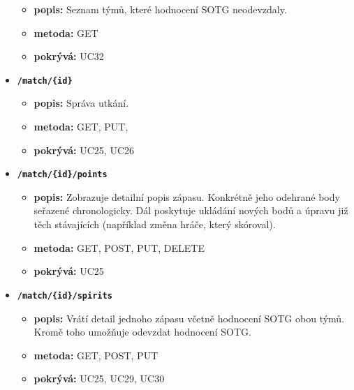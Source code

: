 \begin{itemize}
  \begin{itemize}
    \item \textbf{popis:} Seznam týmů, které hodnocení SOTG neodevzdaly.
    \item \textbf{metoda:} GET
    \item \textbf{pokrývá:} UC32
  \end{itemize}
  \item \texttt{\textbf{/match/\{id\}}}
  \begin{itemize}
    \item \textbf{popis:} Správa utkání.
    \item \textbf{metoda:} GET, PUT, 
    \item \textbf{pokrývá:} UC25, UC26
  \end{itemize}
  \item \texttt{\textbf{/match/\{id\}/points}}
  \begin{itemize}
    \item \textbf{popis:} Zobrazuje detailní popis zápasu. Konkrétně jeho odehrané body seřazené chronologicky.
      Dál poskytuje ukládání nových bodů a úpravu již těch stávajících (například změna hráče, který skóroval).
    \item \textbf{metoda:} GET, POST, PUT, DELETE
    \item \textbf{pokrývá:} UC25
  \end{itemize}
  \item \texttt{\textbf{/match/\{id\}/spirits}}
  \begin{itemize}
    \item \textbf{popis:} Vrátí detail jednoho zápasu včetně hodnocení SOTG obou týmů. Kromě toho umožňuje odevzdat hodnocení SOTG.
    \item \textbf{metoda:} GET, POST, PUT
    \item \textbf{pokrývá:} UC25, UC29, UC30
  \end{itemize}
\end{itemize}